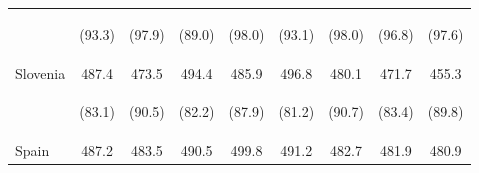\begin{center}
\begin{tabular}{lcccccccc}
 & \begin{footnotesize}(93.3)\end{footnotesize} & \begin{footnotesize}(97.9)\end{footnotesize} & \begin{footnotesize}(89.0)\end{footnotesize} & \begin{footnotesize}(98.0)\end{footnotesize} & \begin{footnotesize}(93.1)\end{footnotesize} & \begin{footnotesize}(98.0)\end{footnotesize} & \begin{footnotesize}(96.8)\end{footnotesize} & \begin{footnotesize}(97.6)\end{footnotesize}\\
\noalign{\smallskip}Slovenia & 487.4 & 473.5 & 494.4 & 485.9 & 496.8 & 480.1 & 471.7 & 455.3\\
 & \begin{footnotesize}(83.1)\end{footnotesize} & \begin{footnotesize}(90.5)\end{footnotesize} & \begin{footnotesize}(82.2)\end{footnotesize} & \begin{footnotesize}(87.9)\end{footnotesize} & \begin{footnotesize}(81.2)\end{footnotesize} & \begin{footnotesize}(90.7)\end{footnotesize} & \begin{footnotesize}(83.4)\end{footnotesize} & \begin{footnotesize}(89.8)\end{footnotesize}\\
\noalign{\smallskip}Spain & 487.2 & 483.5 & 490.5 & 499.8 & 491.2 & 482.7 & 481.9 & 480.9\\

\end{tabular}
\end{center}
